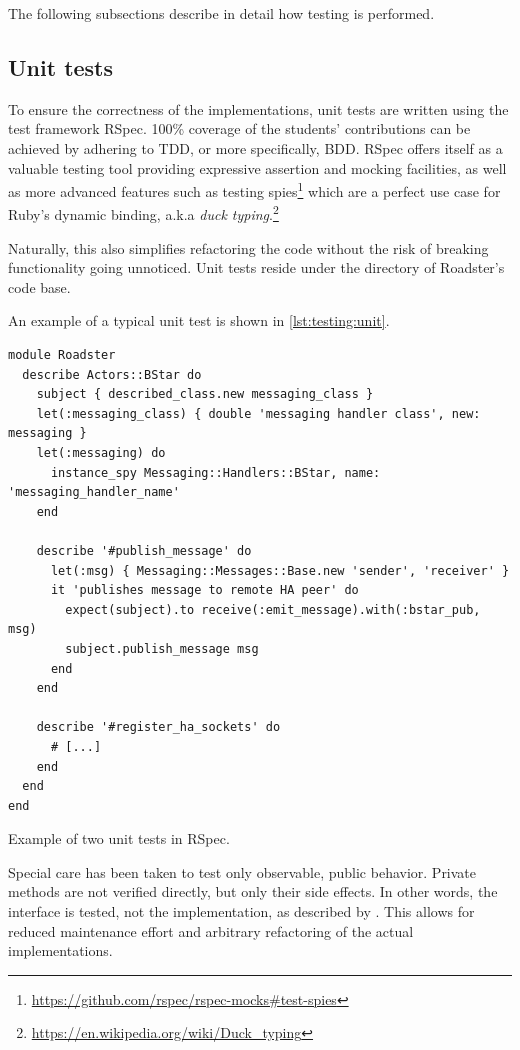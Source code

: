 The following subsections describe in detail how testing is performed.

\subsection{Unit tests}
To ensure the correctness of the implementations, unit tests are written using the test framework
RSpec. 100\% coverage of the students' contributions can be achieved by
adhering to \gls{TDD}, or more specifically, \gls{BDD}. RSpec offers itself as
a valuable testing tool providing expressive assertion and mocking
facilities, as well as more advanced features such as testing spies\footnote{\url{https://github.com/rspec/rspec-mocks\#test-spies}} which
are a perfect use case for Ruby's dynamic binding, a.k.a \emph{duck typing}.\footnote{\url{https://en.wikipedia.org/wiki/Duck_typing}}

Naturally, this also simplifies refactoring the code without the risk of
breaking functionality going unnoticed. Unit tests reside under the 
directory of Roadster's code base.

An example of a typical unit test is shown in \autoref{lst:testing:unit}.


\begin{listing}
	\begin{verbatim}
module Roadster
  describe Actors::BStar do
    subject { described_class.new messaging_class }
    let(:messaging_class) { double 'messaging handler class', new: messaging }
    let(:messaging) do
      instance_spy Messaging::Handlers::BStar, name: 'messaging_handler_name'
    end

    describe '#publish_message' do
      let(:msg) { Messaging::Messages::Base.new 'sender', 'receiver' }
      it 'publishes message to remote HA peer' do
        expect(subject).to receive(:emit_message).with(:bstar_pub, msg)
        subject.publish_message msg
      end
    end

    describe '#register_ha_sockets' do
      # [...]
    end
  end
end
	\end{verbatim}
	\caption{Example of two unit tests in RSpec.}
	\label{lst:testing:unit}
\end{listing}


Special care has been taken to test only observable, public behavior.
Private methods are not verified directly, but only their side effects. In
other words, the interface is tested, not the implementation, as described by
\cite{rb:testing:magic-tricks}. This allows for reduced maintenance effort and
arbitrary refactoring of the actual implementations.

